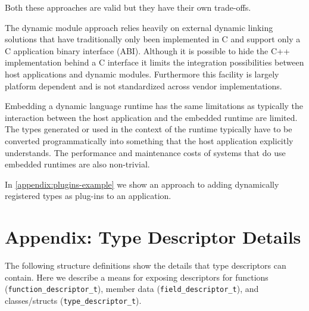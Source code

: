 \documentclass[10pt,a4paper]{article}
\begin{document}
Both these approaches are valid but they have their own trade-offs.

The dynamic module approach relies heavily on external dynamic linking solutions
that have traditionally only been implemented in C and support only a C
application binary interface (ABI). Although it is possible to hide the C++
implementation behind a C interface it limits the integration possibilities
between host applications and dynamic modules. Furthermore this facility is
largely platform dependent and is not standardized across vendor
implementations.

Embedding a dynamic language runtime has the same limitations as typically the
interaction between the host application and the embedded runtime are limited.
The types generated or used in the context of the runtime typically have to be
converted programmatically into something that the host application explicitly
understands. The performance and maintenance costs of systems that do use
embedded runtimes are also non-trivial.

In \autoref{appendix:plugins-example} we show an approach to adding dynamically
registered types as plug-ins to an application.

\appendix
\section{Appendix: Type Descriptor Details}
\label{appendix:type-descriptors-appendix}
The following structure definitions show the details that type descriptors can
contain. Here we describe a means for exposing descriptors for functions
(\verb+function_descriptor_t+), member data (\verb+field_descriptor_t+), and
classes/structs (\verb+type_descriptor_t+).
\end{document}
